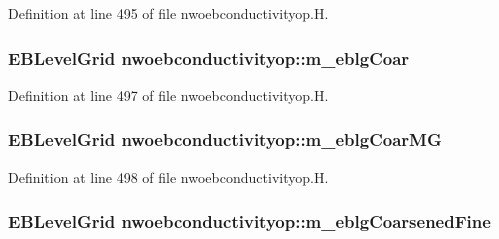 Definition at line 495 of file nwoebconductivityop.\+H.

\subsubsection[{\texorpdfstring{m\+\_\+eblg\+Coar}{m_eblgCoar}}]{\setlength{\rightskip}{0pt plus 5cm}E\+B\+Level\+Grid nwoebconductivityop\+::m\+\_\+eblg\+Coar\hspace{0.3cm}{\ttfamily [protected]}}\hypertarget{classnwoebconductivityop_a7ec6968607d68f7ce78fdf91705d8206}{}\label{classnwoebconductivityop_a7ec6968607d68f7ce78fdf91705d8206}


Definition at line 497 of file nwoebconductivityop.\+H.

\subsubsection[{\texorpdfstring{m\+\_\+eblg\+Coar\+MG}{m_eblgCoarMG}}]{\setlength{\rightskip}{0pt plus 5cm}E\+B\+Level\+Grid nwoebconductivityop\+::m\+\_\+eblg\+Coar\+MG\hspace{0.3cm}{\ttfamily [protected]}}\hypertarget{classnwoebconductivityop_a6ce53bff56532a77f4036e16816dcb66}{}\label{classnwoebconductivityop_a6ce53bff56532a77f4036e16816dcb66}


Definition at line 498 of file nwoebconductivityop.\+H.

\subsubsection[{\texorpdfstring{m\+\_\+eblg\+Coarsened\+Fine}{m_eblgCoarsenedFine}}]{\setlength{\rightskip}{0pt plus 5cm}E\+B\+Level\+Grid nwoebconductivityop\+::m\+\_\+eblg\+Coarsened\+Fine\hspace{0.3cm}{\ttfamily [protected]}}\hypertarget{classnwoebconductivityop_a20e0e73315a68f38fa6585c7958de431}{}\label{classnwoebconductivityop_a20e0e73315a68f38fa6585c7958de431}


